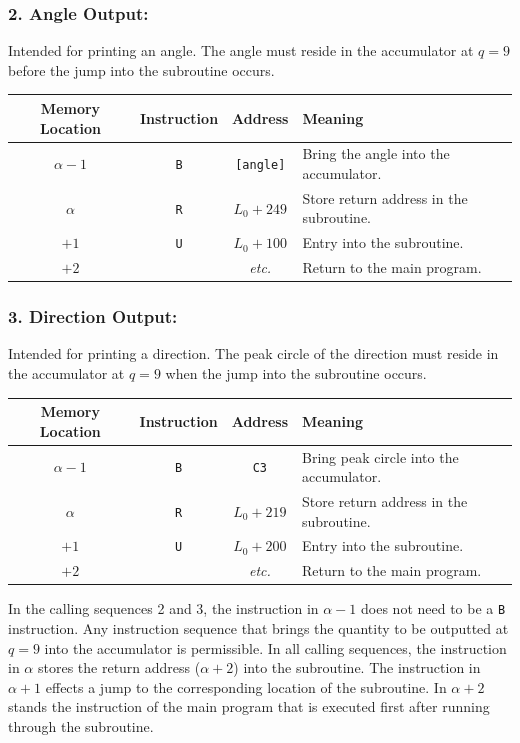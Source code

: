 \subsubsection*{2. Angle Output:}
Intended for printing an angle. The angle must reside in the accumulator at $q = 9$ before the jump into the subroutine occurs.
\begin{table}[h!]
\centering
\begin{tabularx}{\textwidth}{cccX}
\toprule
\textbf{Memory Location} & \textbf{Instruction} & \textbf{Address} & \textbf{Meaning} \\
\midrule
$\alpha - 1$ & \texttt{B} & \texttt{[angle]} & Bring the angle into the accumulator. \\
$\alpha$     & \texttt{R} & $L_0 + 249$ & Store return address in the subroutine. \\
$+1$         & \texttt{U} & $L_0 + 100$ & Entry into the subroutine. \\
$+2$         &            & \textit{etc.} & Return to the main program. \\
\bottomrule
\end{tabularx}
\end{table}

\subsubsection*{3. Direction Output:}
Intended for printing a direction. The peak circle of the direction must reside in the accumulator at $q = 9$ when the jump into the subroutine occurs.
\begin{table}[h!]
\centering
\begin{tabularx}{\textwidth}{cccX}
\toprule
\textbf{Memory Location} & \textbf{Instruction} & \textbf{Address} & \textbf{Meaning} \\
\midrule
$\alpha - 1$ & \texttt{B} & \texttt{C3} & Bring peak circle into the accumulator. \\
$\alpha$     & \texttt{R} & $L_0 + 219$ & Store return address in the subroutine. \\
$+1$         & \texttt{U} & $L_0 + 200$ & Entry into the subroutine. \\
$+2$         &            & \textit{etc.} & Return to the main program. \\
\bottomrule
\end{tabularx}
\end{table}

In the calling sequences 2 and 3, the instruction in $\alpha-1$ does not need to be a \texttt{B} instruction. Any instruction sequence that brings the quantity to be outputted at $q = 9$ into the accumulator is permissible. In all calling sequences, the instruction in $\alpha$ stores the return address ($\alpha+2$) into the subroutine. The instruction in $\alpha+1$ effects a jump to the corresponding location of the subroutine. In $\alpha+2$ stands the instruction of the main program that is executed first after running through the subroutine.

